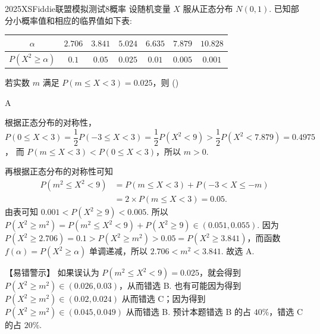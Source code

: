 
\begin{problem}{2025}{XS}{Fiddie联盟模拟测试}{8}{概率}
设随机变量 $ X $ 服从正态分布 $ N(0,1) $. 已知部分小概率值和相应的临界值如下表:
\begin{center}
\begin{tabular}{|c|c|c|c|c|c|c|}
  \hline
$ \alpha $ & $ 2.706 $ & $ 3.841 $ & $ 5.024 $ & $ 6.635 $ & $ 7.879 $ & $ 10.828 $ \\
\hline
$ P(X^2 \geqslant \alpha) $ & $ 0.1 $ & $ 0.05 $ & $ 0.025 $ & $ 0.01 $ & $ 0.005 $ & $ 0.001 $ \\\hline
\end{tabular}
\end{center}
若实数 $ m $ 满足 $ P(m \leqslant X < 3) = 0.025 $，则 (\hspace{1cm})
\begin{choices}
\end{choices}
\end{problem}

\begin{answer}
A
\end{answer}

\begin{solutions}
 根据正态分布的对称性，
$ P(0 \leqslant X < 3) = \dfrac{1}{2}P(-3 \leqslant X < 3) = \dfrac{1}{2}P(X^2 < 9) > \dfrac{1}{2}P(X^2 < 7.879) = 0.4975 $，
而 $ P(m \leqslant X < 3) < P(0 \leqslant X < 3) $，所以 $ m > 0 $.

再根据正态分布的对称性可知
\begin{align*}
P(m^2 \leqslant X^2 < 9) &= P(m \leqslant X < 3) + P(-3 < X \leqslant -m) \\
&= 2 \times P(m \leqslant X < 3) = 0.05 .
\end{align*}
由表可知 $ 0.001 < P(X^2 \geqslant 9) < 0.005 $.
所以 $ P(X^2 \geqslant m^2) = P(m^2 \leqslant X^2 < 9) + P(X^2 \geqslant 9) \in (0.051, 0.055) $.
因为 $ P(X^2 \geqslant 2.706) = 0.1 > P(X^2 \geqslant m^2) > 0.05 = P(X^2 \geqslant 3.841) $，而函数 $ f(\alpha) = P(X^2 \geqslant \alpha) $ 单调递减，所以 $ 2.706 < m^2 < 3.841 $. 故选 A.

【易错警示】 如果误认为 $ P(m^2 \leqslant X^2 < 9) = 0.025 $，就会得到 $ P(X^2 \geqslant m^2) \in (0.026, 0.03) $，从而错选 B. 也有可能因为得到 $ P(X^2 \geqslant m^2) \in (0.02, 0.024) $ 从而错选 C；因为得到 $ P(X^2 \geqslant m^2) \in (0.045, 0.049) $ 从而错选 B. 预计本题错选 B 的占 $ 40\% $，错选 C 的占 $ 20\% $.
\end{solutions}